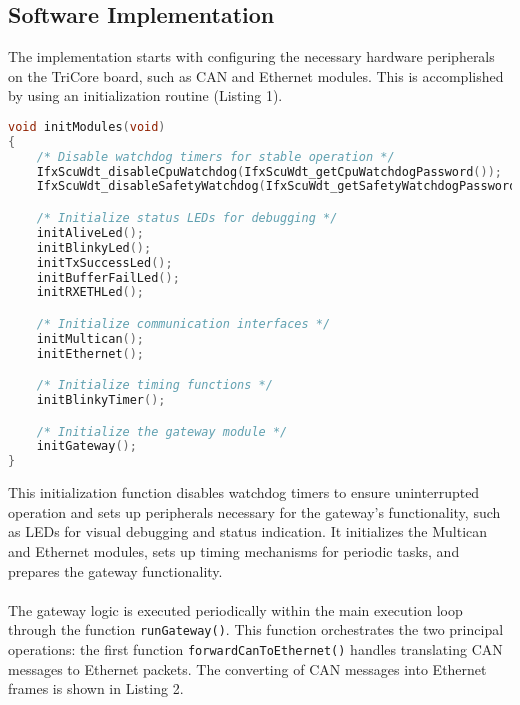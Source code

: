 \subsection{Software Implementation}
The implementation starts with configuring the necessary hardware peripherals on the TriCore board, such as CAN and Ethernet modules. This is accomplished by using an initialization routine (Listing 1).
\begin{lstlisting}[language=C, caption={Initialization of modules (Cpu0_Main.c)}, label={lst:ini_module}]
void initModules(void)
{
    /* Disable watchdog timers for stable operation */
    IfxScuWdt_disableCpuWatchdog(IfxScuWdt_getCpuWatchdogPassword());
    IfxScuWdt_disableSafetyWatchdog(IfxScuWdt_getSafetyWatchdogPassword());

    /* Initialize status LEDs for debugging */
    initAliveLed();
    initBlinkyLed();
    initTxSuccessLed();
    initBufferFailLed();
    initRXETHLed();

    /* Initialize communication interfaces */
    initMultican();
    initEthernet();

    /* Initialize timing functions */
    initBlinkyTimer();

    /* Initialize the gateway module */
    initGateway();
}
\end{lstlisting}
This initialization function disables watchdog timers to ensure uninterrupted operation and sets up peripherals necessary for the gateway’s functionality, such as LEDs for visual debugging and status indication. It initializes the Multican and Ethernet modules, sets up timing mechanisms for periodic tasks, and prepares the gateway functionality.\\\\
The gateway logic is executed periodically within the main execution loop through the function \verb|runGateway()|. This function orchestrates the two principal operations: the first function \verb|forwardCanToEthernet()| handles translating CAN messages to Ethernet packets. The converting of CAN messages into Ethernet frames is shown in Listing 2.
